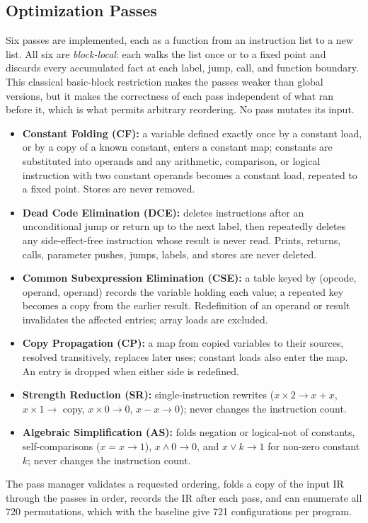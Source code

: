 \documentclass[conference]{IEEEtran}
\begin{document}
\subsection{Optimization Passes}
\label{sec:passes}
Six passes are implemented, each as a function from an instruction list to a new list. All six are \emph{block-local}: each walks the list once or to a fixed point and discards every accumulated fact at each label, jump, call, and function boundary. This classical basic-block restriction makes the passes weaker than global versions, but it makes the correctness of each pass independent of what ran before it, which is what permits arbitrary reordering. No pass mutates its input.
\begin{itemize}
    \item \textbf{Constant Folding (CF):} a variable defined exactly once by a constant load, or by a copy of a known constant, enters a constant map; constants are substituted into operands and any arithmetic, comparison, or logical instruction with two constant operands becomes a constant load, repeated to a fixed point. Stores are never removed.
    \item \textbf{Dead Code Elimination (DCE):} deletes instructions after an unconditional jump or return up to the next label, then repeatedly deletes any side-effect-free instruction whose result is never read. Prints, returns, calls, parameter pushes, jumps, labels, and stores are never deleted.
    \item \textbf{Common Subexpression Elimination (CSE):} a table keyed by (opcode, operand, operand) records the variable holding each value; a repeated key becomes a copy from the earlier result. Redefinition of an operand or result invalidates the affected entries; array loads are excluded.
    \item \textbf{Copy Propagation (CP):} a map from copied variables to their sources, resolved transitively, replaces later uses; constant loads also enter the map. An entry is dropped when either side is redefined.
    \item \textbf{Strength Reduction (SR):} single-instruction rewrites ($x \times 2 \to x + x$, $x \times 1 \to$ copy, $x \times 0 \to 0$, $x - x \to 0$); never changes the instruction count.
    \item \textbf{Algebraic Simplification (AS):} folds negation or logical-not of constants, self-comparisons ($x = x \to 1$), $x \wedge 0 \to 0$, and $x \vee k \to 1$ for non-zero constant $k$; never changes the instruction count.
\end{itemize}
The pass manager validates a requested ordering, folds a copy of the input IR through the passes in order, records the IR after each pass, and can enumerate all 720 permutations, which with the baseline give 721 configurations per program.
\end{document}
